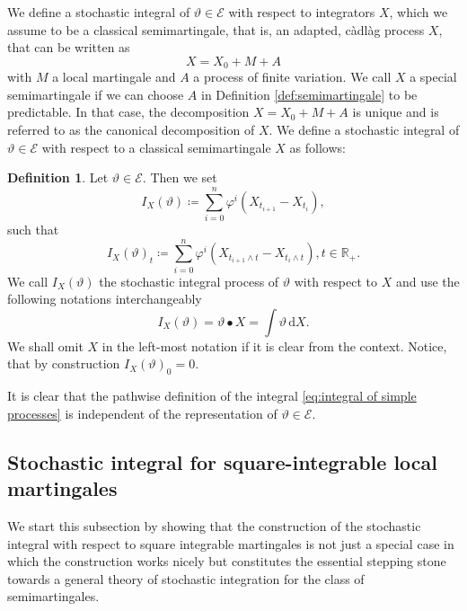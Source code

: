 \documentclass[11pt,a4paper,twoside,openany]{report}
\numberwithin{equation}{section}
\newcommand{\diff}{\mathrm{d}}
\theoremstyle{plain} %
\theoremstyle{definition} %
\newtheorem{definition}[theorem]{Definition}
\theoremstyle{remark} %
\begin{document}
We define a stochastic integral of \(\vartheta\in\mathcal{E}\) with respect to integrators \(X\), which we assume to be a classical semimartingale, that is, an adapted, càdlàg process \(X\), that can be written as 
\begin{equation}\label{def:semimartingale}
    X = X_0+M+A
\end{equation}
with \(M\) a local martingale and \(A\) a process of finite variation. We call \(X\) a special semimartingale if we can choose \(A\) in Definition \eqref{def:semimartingale} to be predictable. In that case, the decomposition \(X=X_0+M+A\) is unique and is referred to as the canonical decomposition of \(X\).
We define a stochastic integral of \(\vartheta\in\mathcal{E}\) with respect to a classical semimartingale \(X\) as follows:
\begin{definition}\label{def:integral of simple processes}
Let \(\vartheta\in\mathcal{E}\). Then we set 
\begin{equation}\label{eq:integral of simple processes}
    I_X(\vartheta)\coloneqq \sum_{i=0}^n \varphi^i(X_{t_{i+1}}-X_{t_{i}}),
\end{equation}
 such that
    \begin{equation}\label{eq:stochastic integral for elementary process}
        I_X(\vartheta)_t\coloneqq \sum_{i=0}^n \varphi^i(X_{t_{i+1}\wedge t}-X_{t_{i}\wedge t}), t\in\mathbb{R}_+.
    \end{equation}
    We call \(I_X(\vartheta)\) the stochastic integral process of \(\vartheta\) with respect to \(X\) and use the following notations interchangeably
    \begin{equation*}
        I_X(\vartheta)=\vartheta\bullet X=\int \vartheta\,\diff X.
    \end{equation*}
    We shall omit \(X\) in the left-most notation if it is clear from the context. Notice, that by construction \(I_X(\vartheta)_0=0\). 
\end{definition}
It is clear that the pathwise definition of the integral \eqref{eq:integral of simple processes} is independent of the representation of \(\vartheta\in\mathcal{E}\).
\subsection{Stochastic integral for square-integrable local martingales}\label{sec:Stochastic Integration for square-integrable Martingales}

 We start this subsection by showing that the construction of the stochastic integral with respect to square integrable martingales is not just a special case in which the construction works nicely but constitutes the essential stepping stone towards a general theory of stochastic integration for the class of semimartingales.
\end{document}
